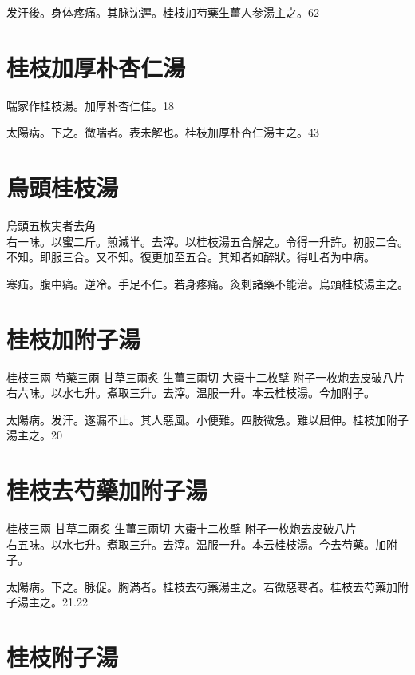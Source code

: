 发汗後。身体疼痛。其脉沈遲。桂枝加芍藥生薑人参湯主之。62

\section{桂枝加厚朴杏仁湯}

喘家作桂枝湯。加厚朴杏仁佳。18

太陽病。下之。微喘者。表未解也。桂枝{\khaaitp 加厚朴杏仁}湯主之。43

\section{烏頭桂枝湯}

烏頭{\scriptsize 五枚実者去角}\\
右一味。以蜜二斤。煎減半。去滓。以桂枝湯五合解之。令得一升許。初服二合。不知。即服三合。又不知。復更加至五合。其知者如醉狀。得吐者为中病。

寒疝。腹中痛。逆冷。手足不仁。若身疼痛。灸刺諸藥不能治。烏頭桂枝湯主之。

\section{桂枝加附子湯}

桂枝{\scriptsize 三兩} 芍藥{\scriptsize 三兩} 甘草{\scriptsize 三兩炙} 生薑{\scriptsize 三兩切} 大棗{\scriptsize 十二枚擘} 附子{\scriptsize 一枚炮去皮破八片}\\
右六味。以水七升。煮取三升。去滓。温服一升。本云桂枝湯。今加附子。

太陽病。发汗。遂漏不止。其人惡風。小便難。四肢微急。難以屈伸。桂枝加附子湯主之。20

\section{桂枝去芍藥加附子湯}

桂枝{\scriptsize 三兩} 甘草{\scriptsize 二兩炙} 生薑{\scriptsize 三兩切} 大棗{\scriptsize 十二枚擘} 附子{\scriptsize 一枚炮去皮破八片}\\
右五味。以水七升。煮取三升。去滓。温服一升。本云桂枝湯。今去芍藥。加附子。

太陽病。下之。脉促。胸滿者。桂枝去芍藥湯主之。若微{\khaaitp 惡}寒者。桂枝去芍藥加附子湯主之。21.22

\section{桂枝附子湯}

